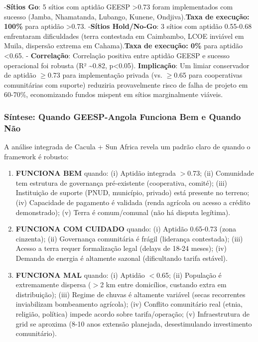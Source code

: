 \documentclass[12pt, a4paper]{article}
\begin{document}
-\textbf{Sítios Go}: 5 sítios com aptidão GEESP >0.73 foram implementados com sucesso (Jamba, Nhamatanda, Lubango, Kunene, Ondjiva).\textbf{Taxa de execução: 100\%} para aptidão >0.73.
-\textbf{Sítios Hold/No-Go}: 3 sítios com aptidão 0.55-0.68 enfrentaram dificuldades (terra contestada em Caimbambo, LCOE inviável em Muila, dispersão extrema em Cahama).\textbf{Taxa de execução: 0\%} para aptidão <0.65.
-
\textbf{Correlação}: Correlação positiva entre aptidão GEESP e sucesso operacional foi robusta (R² \textasciitilde{}0.82, p<0.05).
\textbf{Implicação}: Um limiar conservador de aptidão $\geq$0.73 para implementação privada (vs. $\geq$0.65 para cooperativas comunitárias com suporte) reduziria provavelmente risco de falha de projeto em 60-70\%, economizando fundos mispent em sítios marginalmente viáveis.

\subsubsection*{Síntese: Quando GEESP-Angola Funciona Bem e Quando Não}

A análise integrada de Cacula + Sun Africa revela um padrão claro de quando o framework é robusto:

\begin{enumerate}
\item\textbf{FUNCIONA BEM} quando: (i) Aptidão integrada $>$0.73; (ii) Comunidade tem estrutura de governança pré-existente (cooperativa, comité); (iii) Instituição de suporte (PNUD, município, privado) está presente no terreno; (iv) Capacidade de pagamento é validada (renda agrícola ou acesso a crédito demonstrado); (v) Terra é comum/comunal (não há disputa legítima).

\item\textbf{FUNCIONA COM CUIDADO} quando: (i) Aptidão 0.65-0.73 (zona cinzenta); (ii) Governança comunitária é frágil (liderança contestada); (iii) Acesso a terra requer formalização legal (delays de 18-24 meses); (iv) Demanda de energia é altamente sazonal (dificultando tarifa estável).

\item\textbf{FUNCIONA MAL} quando: (i) Aptidão $<$0.65; (ii) População é extremamente dispersa ($>$2 km entre domicílios, custando extra em distribuição); (iii) Regime de chuvas é altamente variável (secas recorrentes inviabilizam bombeamento agrícola); (iv) Conflito comunitário real (etnia, religião, política) impede acordo sobre tarifa/operação; (v) Infraestrutura de grid se aproxima (8-10 anos extensão planejada, desestimulando investimento comunitário).

\end{enumerate}
\end{document}

